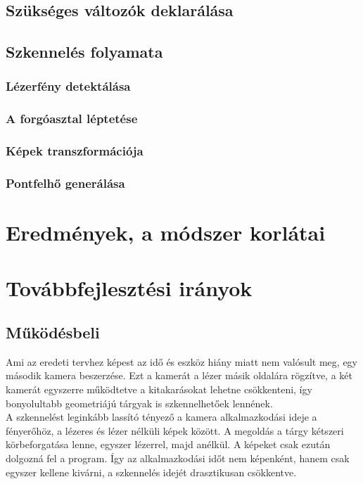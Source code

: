 \documentclass[12pt,a4paper]{article}
\begin{document}
\subsection{Szükséges változók deklarálása}
\subsection{Szkennelés folyamata}
\subsubsection{Lézerfény detektálása}
\subsubsection{A forgóasztal léptetése}
\subsubsection{Képek transzformációja}
\subsubsection{Pontfelhő generálása}
\section{Eredmények, a módszer korlátai}
\section{Továbbfejlesztési irányok}
\subsection{Működésbeli}
Ami az eredeti tervhez képest az idő és eszköz hiány miatt nem valósult meg, egy második kamera beszerzése. Ezt a kamerát a lézer másik oldalára rögzítve, a két kamerát egyszerre működtetve a kitakarásokat lehetne csökkenteni, így bonyolultabb geometriájú tárgyak is szkennelhetőek lennének.
\\[10pt]
A szkennelést leginkább lassító tényező a kamera alkalmazkodási ideje a fényerőhöz, a lézeres és lézer nélküli képek között. A megoldás a tárgy kétszeri körbeforgatása lenne, egyszer lézerrel, majd anélkül. A képeket csak ezután dolgozná fel a program. Így az alkalmazkodási időt nem képenként, hanem csak egyszer kellene kivárni, a szkennelés idejét drasztikusan csökkentve.
\end{document}
